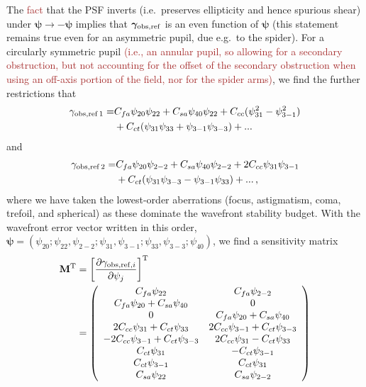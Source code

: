 \documentclass[usenatbib]{mnras}
\newcommand{\changetext}[1]{\textcolor{brown}{#1}}
\begin{document}
The \changetext{fact} that the PSF inverts (i.e.\ preserves ellipticity and
hence spurious shear) under
${\boldsymbol\psi}\rightarrow-{\boldsymbol\psi}$ implies that
${\boldsymbol\gamma}_{\rm obs,ref}$ is an even function of
${\boldsymbol\psi}$ (this statement remains true even for an
asymmetric pupil, due e.g.\ to the spider). For a circularly symmetric
pupil \changetext{(i.e., an annular pupil, so allowing for a secondary obstruction, but not accounting for the offset of the secondary obstruction when using an off-axis portion of the field, nor for the spider arms)}, we find the further restrictions that
\begin{align}
\gamma_{\rm obs,ref\,1} =& C_{fa} \psi_{20} \psi_{22} + C_{sa} \psi_{40} \psi_{22}
+ C_{cc} (\psi_{31}^2-\psi_{3-1}^2) \nonumber\\
&+ C_{ct} (\psi_{31}\psi_{33} + \psi_{3-1}\psi_{3-3})
+ ... \label{eq:temp.314159}
\end{align}
and
\begin{align}
\gamma_{\rm obs,ref\,2} =& C_{fa} \psi_{20} \psi_{2-2} + C_{sa} \psi_{40} \psi_{2-2}
+ 2C_{cc} \psi_{31} \psi_{3-1} \nonumber\\
&+ C_{ct} (\psi_{31}\psi_{3-3} - \psi_{3-1}\psi_{33})
+ ...\,,
\end{align}
where we have taken the lowest-order aberrations (focus, astigmatism,
coma, trefoil, and spherical) as these dominate the wavefront
stability budget. With the wavefront error vector written in this
order, ${\boldsymbol\psi} = (\psi_{20}; \psi_{22},\psi_{2-2};
\psi_{31},\psi_{3-1}; \psi_{33},\psi_{3-3}; \psi_{40})$, we find a
sensitivity matrix
\begin{align}
{\bf M}^{\rm T} &= \left[ \frac{\partial \gamma_{{\rm obs,ref},i}}{\partial\psi_j} \right]^{\rm T}\nonumber\\
&= \left( \begin{array}{cc}
C_{fa}\psi_{22}  & C_{fa}\psi_{2-2} \\
C_{fa}\psi_{20}+C_{sa}\psi_{40} & 0 \\
0 & C_{fa}\psi_{20}+C_{sa}\psi_{40} \\
2C_{cc}\psi_{31}+C_{ct}\psi_{33} & 2C_{cc}\psi_{3-1}+C_{ct}\psi_{3-3} \\
-2C_{cc}\psi_{3-1}+C_{ct}\psi_{3-3} & 2C_{cc}\psi_{31}-C_{ct}\psi_{33} \\
C_{ct}\psi_{31} & -C_{ct}\psi_{3-1} \\
C_{ct}\psi_{3-1} & C_{ct}\psi_{31} \\
C_{sa}\psi_{22} & C_{sa}\psi_{2-2}
\end{array} \right)
\label{eq:TheMatrix}
\end{align}
\end{document}
